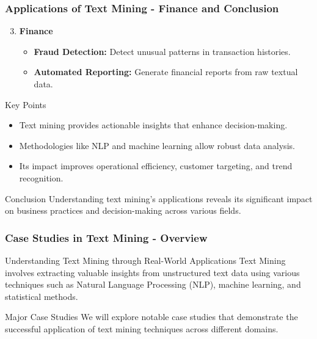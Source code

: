 \documentclass[aspectratio=169]{beamer}
\begin{document}
\begin{frame}[fragile]
    \frametitle{Applications of Text Mining - Finance and Conclusion}
    \begin{enumerate}
        \setcounter{enumi}{2}
        \item \textbf{Finance}
        \begin{itemize}
            \item \textbf{Fraud Detection:} Detect unusual patterns in transaction histories.
            \item \textbf{Automated Reporting:} Generate financial reports from raw textual data.
        \end{itemize}
    \end{enumerate}

    \begin{block}{Key Points}
        \begin{itemize}
            \item Text mining provides actionable insights that enhance decision-making.
            \item Methodologies like NLP and machine learning allow robust data analysis.
            \item Its impact improves operational efficiency, customer targeting, and trend recognition.
        \end{itemize}
    \end{block}

    \begin{block}{Conclusion}
        Understanding text mining's applications reveals its significant impact on business practices and decision-making across various fields.
    \end{block}
\end{frame}

\begin{frame}[fragile]
  \frametitle{Case Studies in Text Mining - Overview}
  \begin{block}{Understanding Text Mining through Real-World Applications}
    Text Mining involves extracting valuable insights from unstructured text data using various techniques such as Natural Language Processing (NLP), machine learning, and statistical methods. 
  \end{block}
  
  \begin{block}{Major Case Studies}
    We will explore notable case studies that demonstrate the successful application of text mining techniques across different domains.
  \end{block}
\end{frame}
\end{document}
